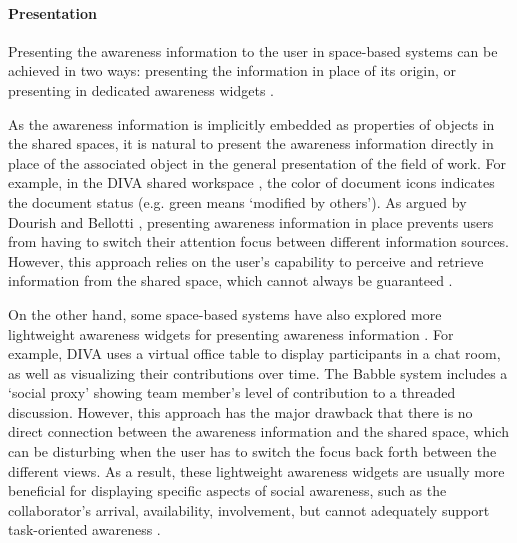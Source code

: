 \paragraph*{Presentation} %
\label{par:presentation}
Presenting the awareness information to the user in space-based systems can be achieved in two ways: presenting the information in place of its origin, or presenting in dedicated awareness widgets \cite{Roseman1996}.

As the awareness information is implicitly embedded as properties of objects in the shared spaces, it is natural to present the awareness information directly in place of the associated object in the general presentation of the field of work. For example, in the DIVA shared workspace \cite{Berlage1999}, the color of document icons indicates the document status (e.g. green means `modified by others'). As argued by Dourish and Bellotti \cite{dourish1992awareness}, presenting awareness information in place prevents users from having to switch their attention focus between different information sources. However, this approach relies on the user's capability to perceive and retrieve information from the shared space, which cannot always be guaranteed \cite{Berlage1999}. 

On the other hand, some space-based systems have also explored more lightweight awareness widgets for presenting awareness information \cite{Gutwin1996}. For example, DIVA uses a virtual office table to display participants in a chat room, as well as visualizing their contributions over time\cite{Berlage1999}. The Babble system \cite{Erickson1999} includes a `social proxy' showing team member's level of contribution to a threaded discussion. However, this approach has the major drawback that there is no direct connection between the awareness information and the shared space, which can be disturbing when the user has to switch the focus back forth between the different views. As a result, these lightweight awareness widgets are usually more beneficial for displaying specific aspects of social awareness, such as the collaborator's arrival, availability, involvement, but cannot adequately support task-oriented awareness \cite{carroll2003a}. 

